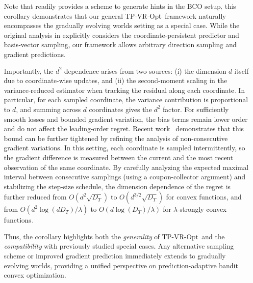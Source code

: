 \documentclass[journal,onecolumn]{IEEEtran}
\newcommand{\cX}{\mathcal{X}}
\theoremstyle{plain}
\theoremstyle{definition}
\theoremstyle{remark}
\newtheorem{remark}[theorem]{Remark}
\newcommand{\tpvr}{{\sc TP-VR-Opt}}
\begin{document}
Note that \cite{chiang2013beating} readily provides a scheme to generate hints in the BCO setup, this corollary demonstrates that our general \tpvr\ framework naturally encompasses the gradually evolving worlds setting as a special case. 
While the original analysis in \cite{chiang2013beating} explicitly considers the coordinate-persistent predictor and basis-vector sampling, our framework allows arbitrary direction sampling and gradient predictions. 

Importantly, the $d^2$ dependence arises from two sources: (i) the dimension $d$ itself due to coordinate-wise updates, and (ii) the second-moment scaling in the variance-reduced estimator when tracking the residual along each coordinate. In particular, for each sampled coordinate, the variance contribution is proportional to $d$, and summing across $d$ coordinates gives the $d^2$ factor. For sufficiently smooth losses and bounded gradient variation, the bias terms remain lower order and do not affect the leading-order regret. Recent work~\cite{yu2026improved} demonstrates that this bound can be further tightened by refining the analysis of non-consecutive gradient variations. 
In this setting, each coordinate is sampled intermittently, so the gradient difference is measured between the current and the most recent observation of the same coordinate. 
By carefully analyzing the expected maximal interval between consecutive samplings (using a coupon-collector argument) and stabilizing the step-size schedule, the dimension dependence of the regret is further reduced from $O(d^2 \sqrt{D_T})$ to $O(d^{3/2} \sqrt{D_T})$ for convex functions, and from $O(d^2 \log(d D_T)/\lambda)$ to $O(d \log(D_T)/\lambda)$ for $\lambda$-strongly convex functions. 



Thus, the corollary highlights both the \textit{generality} of \tpvr\ and the \textit{compatibility} with previously studied special cases. Any alternative sampling scheme or improved gradient prediction immediately extends to gradually evolving worlds, providing a unified perspective on prediction-adaptive bandit convex optimization.

\end{document}

